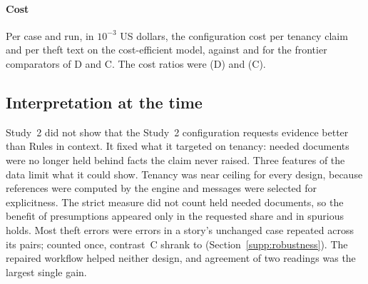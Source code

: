 \paragraph{Cost}
Per case and run, in $10^{-3}$ US dollars, the configuration cost \stCostTenCPvTwoLuna{} per tenancy claim and \stCostThCPvTwoLuna{} per theft text on the cost-efficient model, against \stCostTenBOneVTwoTerra{} and \stCostThRTerra{} for the frontier comparators of D and C. The cost ratios were \stCostRatioD{} (D) and \stCostRatioC{} (C).

\subsection{Interpretation at the time}
\label{app:s2-interpretation}

Study~2 did not show that the Study~2 configuration requests evidence better than Rules in context. It fixed what it targeted on tenancy: needed documents were no longer held behind facts the claim never raised. Three features of the data limit what it could show. Tenancy was near ceiling for every design, because references were computed by the engine and messages were selected for explicitness. The strict measure did not count held needed documents, so the benefit of presumptions appeared only in the requested share and in spurious holds. Most theft errors were errors in a story's unchanged case repeated across its pairs; counted once, contrast~C shrank to \stSecCDedupDiff{} (Section~\ref{supp:robustness}). The repaired workflow helped neither design, and agreement of two readings was the largest single gain.

